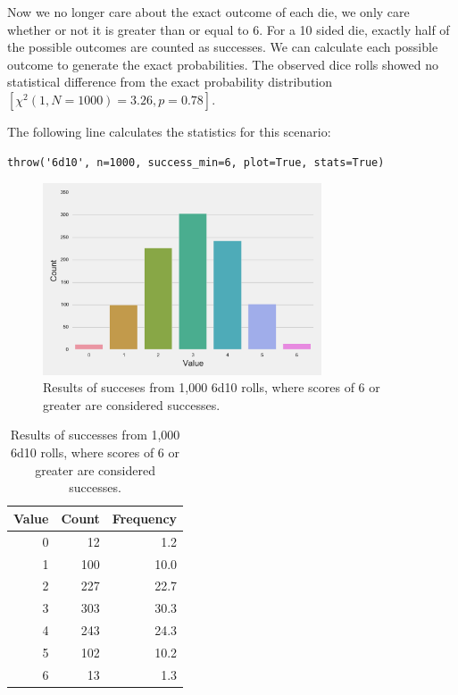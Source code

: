 \documentclass[twocolumn,letterpaper]{article}  %
\begin{document}
Now we no longer care about the exact outcome of each die, we only care whether or not it is greater than or equal to 6. For a 10 sided die, exactly half of the possible outcomes are counted as successes. We can calculate each possible outcome to generate the exact probabilities. The observed dice rolls showed no statistical difference from the exact probability distribution $[\chi^2 (1,N=1000)=3.26, p=0.78]$.

The following line calculates the statistics for this scenario:
\begin{lstlisting}
throw('6d10', n=1000, success_min=6, plot=True, stats=True)
\end{lstlisting}

\begin{figure}[H]
\centering
\includegraphics[width=3.25in]{6d10_min6.pdf}
\caption{Results of succeses from 1,000 6d10 rolls, where scores of 6 or greater are considered successes.}
\end{figure}

\begin{table}[H]
\begin{center}
\begin{tabular}{*{3}{r}}
\toprule
Value & Count & Frequency \\
\midrule
     0 &    12 &       1.2 \\
     1 &   100 &      10.0 \\
     2 &   227 &      22.7 \\
     3 &   303 &      30.3 \\
     4 &   243 &      24.3 \\
     5 &   102 &      10.2 \\
     6 &    13 &       1.3 \\
\bottomrule
\end{tabular}
\end{center}
\caption{Results of successes from 1,000 6d10 rolls, where scores of 6 or greater are considered successes.}
\end{table}
\end{document}
